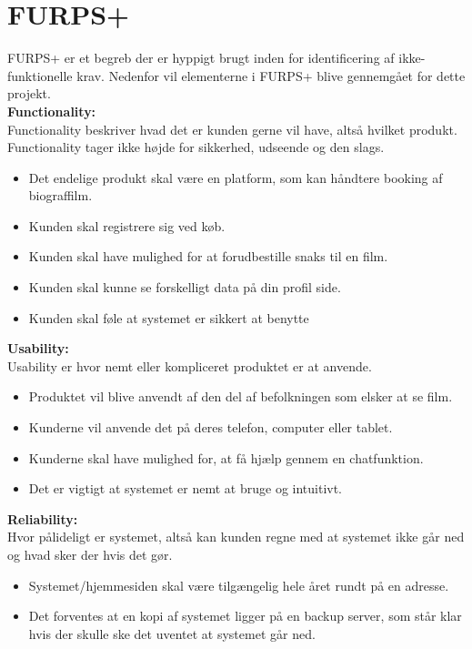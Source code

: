 \section{FURPS+}\label{sec:furps}
FURPS+ er et begreb der er hyppigt brugt inden for identificering af ikke-funktionelle krav. Nedenfor vil elementerne i FURPS+ 
blive gennemgået for dette projekt. \\

\textbf{Functionality:} \\
Functionality beskriver hvad det er kunden gerne vil have, altså hvilket produkt. Functionality tager ikke højde for sikkerhed, udseende og den slags.
\begin{itemize}
    \item Det endelige produkt skal være en platform, som kan håndtere booking af biograffilm.
    \item Kunden skal registrere sig ved køb.
    \item Kunden skal have mulighed for at forudbestille snaks til en film.
    \item Kunden skal kunne se forskelligt data på din profil side.
    \item Kunden skal føle at systemet er sikkert at benytte \\
\end{itemize}

\textbf{Usability:} \\
Usability er hvor nemt eller kompliceret produktet er at anvende. 
\begin{itemize}
    \item Produktet vil blive anvendt af den del af befolkningen som elsker at se film.
    \item Kunderne vil anvende det på deres telefon, computer eller tablet.
    \item Kunderne skal have mulighed for, at få hjælp gennem en chatfunktion.
    \item Det er vigtigt at systemet er nemt at bruge og intuitivt.
\end{itemize} 

\textbf{Reliability:} \\
Hvor pålideligt er systemet, altså kan kunden regne med at systemet ikke går ned og hvad sker der hvis det gør.

\begin{itemize}
    \item Systemet/hjemmesiden skal være tilgængelig hele året rundt på en adresse.
    \item Det forventes at en kopi af systemet ligger på en backup server, som står klar hvis der skulle ske det uventet at systemet går ned.
\end{itemize}

